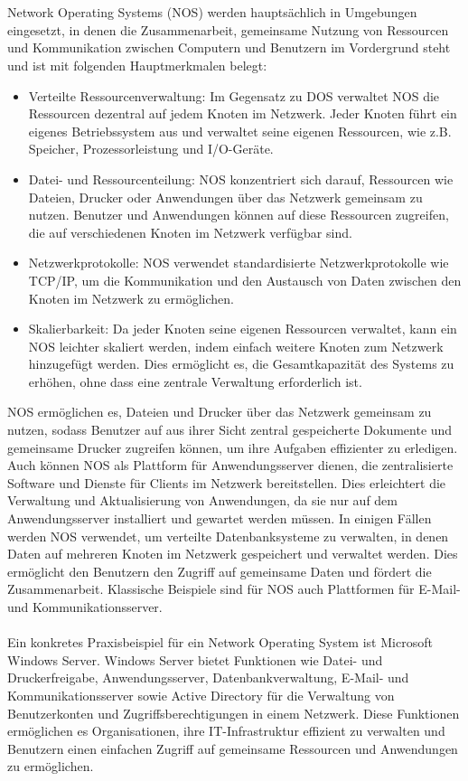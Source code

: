 \documentclass[../vs-script-first-v01.tex]{subfiles}
\begin{document}
\\\\
Network Operating Systems (NOS) werden hauptsächlich in Umgebungen eingesetzt, in denen die Zusammenarbeit, gemeinsame Nutzung von Ressourcen und Kommunikation zwischen Computern und Benutzern im Vordergrund steht und ist mit folgenden Hauptmerkmalen belegt: 
\begin{itemize}
\item Verteilte Ressourcenverwaltung: Im Gegensatz zu DOS verwaltet NOS die Ressourcen dezentral auf jedem Knoten im Netzwerk. Jeder Knoten führt ein eigenes Betriebssystem aus und verwaltet seine eigenen Ressourcen, wie z.B. Speicher, Prozessorleistung und I/O-Geräte.
\item Datei- und Ressourcenteilung: NOS konzentriert sich darauf, Ressourcen wie Dateien, Drucker oder Anwendungen über das Netzwerk gemeinsam zu nutzen. Benutzer und Anwendungen können auf diese Ressourcen zugreifen, die auf verschiedenen Knoten im Netzwerk verfügbar sind.
\item Netzwerkprotokolle: NOS verwendet standardisierte Netzwerkprotokolle wie TCP/IP, um die Kommunikation und den Austausch von Daten zwischen den Knoten im Netzwerk zu ermöglichen.
\item Skalierbarkeit: Da jeder Knoten seine eigenen Ressourcen verwaltet, kann ein NOS leichter skaliert werden, indem einfach weitere Knoten zum Netzwerk hinzugefügt werden. Dies ermöglicht es, die Gesamtkapazität des Systems zu erhöhen, ohne dass eine zentrale Verwaltung erforderlich ist.
\end{itemize}
NOS ermöglichen es, Dateien und Drucker über das Netzwerk gemeinsam zu nutzen, sodass Benutzer auf aus ihrer Sicht zentral gespeicherte Dokumente und gemeinsame Drucker zugreifen können, um ihre Aufgaben effizienter zu erledigen. Auch können NOS als Plattform für Anwendungsserver dienen, die zentralisierte Software und Dienste für Clients im Netzwerk bereitstellen. Dies erleichtert die Verwaltung und Aktualisierung von Anwendungen, da sie nur auf dem Anwendungsserver installiert und gewartet werden müssen. In einigen Fällen werden NOS verwendet, um verteilte Datenbanksysteme zu verwalten, in denen Daten auf mehreren Knoten im Netzwerk gespeichert und verwaltet werden. Dies ermöglicht den Benutzern den Zugriff auf gemeinsame Daten und fördert die Zusammenarbeit. Klassische Beispiele sind für NOS auch Plattformen für E-Mail- und Kommunikationsserver.
\\\\
Ein konkretes Praxisbeispiel für ein Network Operating System ist Microsoft Windows Server. Windows Server bietet Funktionen wie Datei- und Druckerfreigabe, Anwendungsserver, Datenbankverwaltung, E-Mail- und Kommunikationsserver sowie Active Directory für die Verwaltung von Benutzerkonten und Zugriffsberechtigungen in einem Netzwerk. Diese Funktionen ermöglichen es Organisationen, ihre IT-Infrastruktur effizient zu verwalten und Benutzern einen einfachen Zugriff auf gemeinsame Ressourcen und Anwendungen zu ermöglichen.
\end{document}
